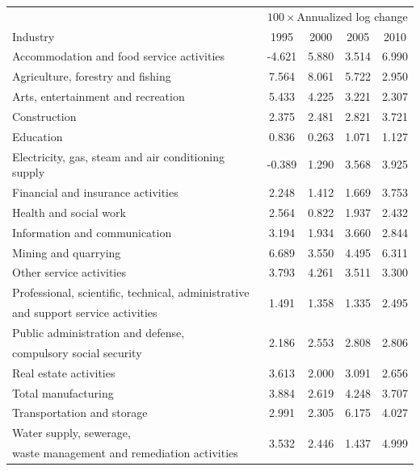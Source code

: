 \documentclass[12pt]{article}
\begin{document}
\begin{table}[h!]
\begin{center}
\scriptsize
\begin{tabular}{l|cccc} 
\hline \hline
& \multicolumn{4}{c}{$100 \times$Annualized log change} \\
Industry & 1995 & 2000 & 2005 & 2010  \\ \hline
Accommodation and food service activities & -4.621 & 5.880 & 3.514 & 6.990 \\
Agriculture, forestry and fishing & 7.564 & 8.061 & 5.722 & 2.950 \\ 
Arts, entertainment and recreation & 5.433 & 4.225 & 3.221 & 2.307 \\
Construction & 2.375 & 2.481 & 2.821 & 3.721 \\
Education & 0.836 & 0.263 & 1.071 & 1.127 \\
Electricity, gas, steam and air conditioning supply & -0.389 & 1.290 & 3.568 & 3.925 \\
Financial and insurance activities & 2.248 & 1.412 & 1.669 & 3.753 \\
Health and social work & 2.564 & 0.822 & 1.937 & 2.432 \\
Information and communication & 3.194 & 1.934 & 3.660 & 2.844 \\
Mining and quarrying & 6.689 & 3.550 & 4.495 & 6.311 \\
Other service activities & 3.793 & 4.261 & 3.511 & 3.300 \\
Professional, scientific, technical, administrative & \multirow{2}{*}{1.491} & \multirow{2}{*}{1.358} & \multirow{2}{*}{1.335} & \multirow{2}{*}{2.495} \\
and support service activities &&&&\\
Public administration and defense,  & \multirow{2}{*}{2.186} & \multirow{2}{*}{2.553} & \multirow{2}{*}{2.808} & \multirow{2}{*}{2.806}\\
compulsory social security &&&&\\
Real estate activities & 3.613 & 2.000 & 3.091 & 2.656 \\
Total manufacturing & 3.884 & 2.619 & 4.248 & 3.707 \\
Transportation and storage & 2.991 & 2.305 & 6.175 & 4.027 \\
Water supply, sewerage,  & \multirow{2}{*}{3.532} & \multirow{2}{*}{2.446} & \multirow{2}{*}{1.437} & \multirow{2}{*}{4.999}  \\
waste management and remediation activities &&&&\\

\end{tabular}
\end{center}
\end{table}
\end{document}
